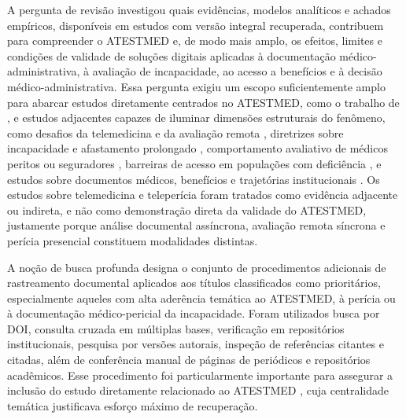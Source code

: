 \documentclass[12pt,a4paper]{article}
\begin{document}
A pergunta de revisão investigou quais evidências, modelos analíticos e achados empíricos, disponíveis em estudos com versão integral recuperada, contribuem para compreender o ATESTMED e, de modo mais amplo, os efeitos, limites e condições de validade de soluções digitais aplicadas à documentação médico-administrativa, à avaliação de incapacidade, ao acesso a benefícios e à decisão médico-administrativa. Essa pergunta exigiu um escopo suficientemente amplo para abarcar estudos diretamente centrados no ATESTMED, como o trabalho de \textcite{soares20241031t0000000000asistematicadoatestmednaconcessa}, e estudos adjacentes capazes de iluminar dimensões estruturais do fenômeno, como desafios da telemedicina e da avaliação remota \parencite{ftouni2022challengesoftelemedicineduringthecovid19pandemica}, diretrizes sobre incapacidade e afastamento prolongado \parencite{gabbay2011niceguidanceonlongtermsicknessandincapacity}, comportamento avaliativo de médicos peritos ou seguradores \parencite{steenbeek2011thedevelopmentofinstrumentstomeasuretheworkdisa}, barreiras de acesso em populações com deficiência \parencite{m2024astudyofdisabilityseveritybarriersandfacilitatingfactor, albasheer2026telemedicineutilizationanddigitalinclusionamongpe}, e estudos sobre documentos médicos, benefícios e trajetórias institucionais \parencite{rajasulochana2026doeshavingadisabilitycertificateensurebenefit, sa2020medicalcertificateofdisabilityadescriptiveanalysisofav, nogueira20200731t0100000100aavaliacaodadeficiencianatraje}. Os estudos sobre telemedicina e teleperícia foram tratados como evidência adjacente ou indireta, e não como demonstração direta da validade do ATESTMED, justamente porque análise documental assíncrona, avaliação remota síncrona e perícia presencial constituem modalidades distintas.

A noção de busca profunda designa o conjunto de procedimentos adicionais de rastreamento documental aplicados aos títulos classificados como prioritários, especialmente aqueles com alta aderência temática ao ATESTMED, à perícia ou à documentação médico-pericial da incapacidade. Foram utilizados busca por DOI, consulta cruzada em múltiplas bases, verificação em repositórios institucionais, pesquisa por versões autorais, inspeção de referências citantes e citadas, além de conferência manual de páginas de periódicos e repositórios acadêmicos. Esse procedimento foi particularmente importante para assegurar a inclusão do estudo diretamente relacionado ao ATESTMED \parencite{soares20241031t0000000000asistematicadoatestmednaconcessa}, cuja centralidade temática justificava esforço máximo de recuperação.
\end{document}
